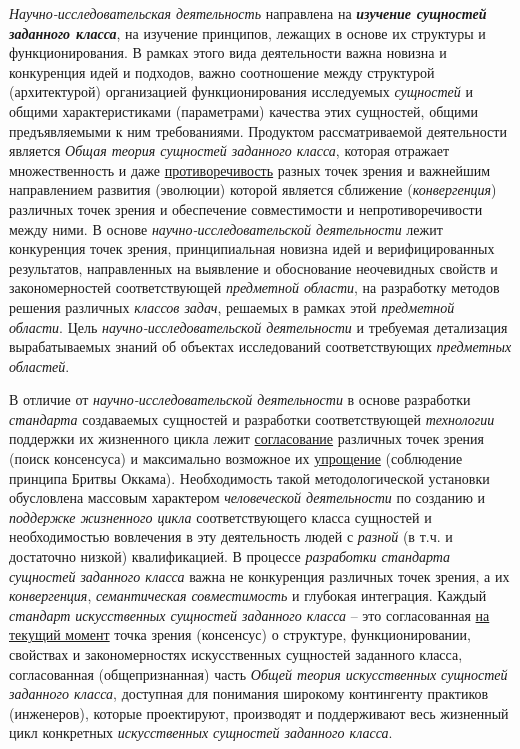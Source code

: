 \textit{Научно-исследовательская деятельность} направлена на \textbf{\textit{изучение сущностей заданного класса}}, на изучение принципов, лежащих в основе их структуры и функционирования. В рамках этого вида деятельности важна новизна и конкуренция идей и подходов, важно соотношение между структурой (архитектурой) организацией функционирования исследуемых \textit{сущностей} и общими характеристиками (параметрами) качества этих сущностей, общими предъявляемыми к ним требованиями. Продуктом рассматриваемой деятельности является \textit{Общая теория сущностей заданного класса}, которая отражает множественность и даже \underline{противоречивость} разных точек зрения и важнейшим направлением развития (эволюции) которой является сближение (\textit{конвергенция}) различных точек зрения и обеспечение совместимости и непротиворечивости между ними. В основе \textit{научно-исследовательской деятельности} лежит конкуренция точек зрения, принципиальная новизна идей и верифицированных результатов, направленных на выявление и обоснование неочевидных свойств и закономерностей соответствующей \textit{предметной области}, на разработку методов решения различных \textit{классов задач}, решаемых в рамках этой \textit{предметной области}. Цель \textit{научно-исследовательской деятельности} и требуемая детализация вырабатываемых знаний об объектах исследований соответствующих \textit{предметных областей}.

В отличие от \textit{научно-исследовательской деятельности} в основе разработки \textit{стандарта} создаваемых сущностей и разработки соответствующей \textit{технологии} поддержки их жизненного цикла лежит \underline{согласование} различных точек зрения (поиск консенсуса) и максимально возможное их \underline{упрощение} (соблюдение принципа Бритвы Оккама). Необходимость такой методологической установки обусловлена массовым характером \textit{человеческой деятельности} по созданию и \textit{поддержке жизненного цикла} соответствующего класса сущностей и необходимостью вовлечения в эту деятельность людей с \textit{разной} (в т.ч. и достаточно низкой) квалификацией. В процессе \textit{разработки стандарта сущностей заданного класса} важна не конкуренция различных точек зрения, а их \textit{конвергенция}, \textit{семантическая совместимость} и глубокая интеграция. Каждый \textit{стандарт} \textit{искусственных сущностей заданного класса} -- это согласованная \underline{на текущий момент} точка зрения (консенсус) о структуре, функционировании, свойствах и закономерностях искусственных сущностей заданного класса, согласованная (общепризнанная) часть \textit{Общей теория искусственных сущностей заданного класса}, доступная для понимания широкому контингенту практиков (инженеров), которые проектируют, производят и поддерживают весь жизненный цикл конкретных \textit{искусственных сущностей заданного класса}.

